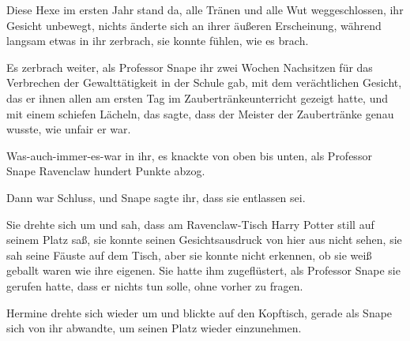 Diese Hexe im ersten Jahr stand da, alle Tränen und alle Wut weggeschlossen, ihr Gesicht unbewegt, nichts änderte sich an ihrer äußeren Erscheinung, während langsam etwas in ihr zerbrach, sie konnte fühlen, wie es brach.

Es zerbrach weiter, als Professor Snape ihr zwei Wochen Nachsitzen für das Verbrechen der Gewalttätigkeit in der Schule gab, mit dem verächtlichen Gesicht, das er ihnen allen am ersten Tag im Zaubertränkeunterricht gezeigt hatte, und mit einem schiefen Lächeln, das sagte, dass der Meister der Zaubertränke genau wusste, wie unfair er war.

Was-auch-immer-es-war in ihr, es knackte von oben bis unten, als Professor Snape Ravenclaw hundert Punkte abzog.

Dann war Schluss, und Snape sagte ihr, dass sie entlassen sei.

Sie drehte sich um und sah, dass am Ravenclaw-Tisch Harry Potter still auf seinem Platz saß, sie konnte seinen Gesichtsausdruck von hier aus nicht sehen, sie sah seine Fäuste auf dem Tisch, aber sie konnte nicht erkennen, ob sie weiß geballt waren wie ihre eigenen. Sie hatte ihm zugeflüstert, als Professor Snape sie gerufen hatte, dass er nichts tun solle, ohne vorher zu fragen.

Hermine drehte sich wieder um und blickte auf den Kopftisch, gerade als Snape sich von ihr abwandte, um seinen Platz wieder einzunehmen.

